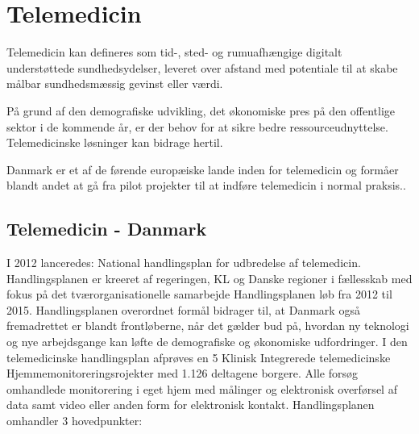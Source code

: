 \section{Telemedicin}
Telemedicin kan defineres som tid-, sted- og rumuafhængige digitalt understøttede sundhedsydelser, leveret over afstand med potentiale til at skabe målbar sundhedsmæssig gevinst eller værdi\cite{Regioner2012}.

På grund af den demografiske udvikling, det økonomiske pres på den offentlige sektor i de kommende år, er der behov for at sikre bedre ressourceudnyttelse. Telemedicinske løsninger kan bidrage hertil.\cite{Regioner2012}
 
Danmark er et af de førende europæiske lande inden for telemedicin og formåer blandt andet at gå fra pilot projekter til at indføre telemedicin i normal praksis.\cite{FabienneAbadieCristianoCodagnone2011}.
  

\subsection{Telemedicin - Danmark}

I 2012 lanceredes: \textquotedbl National handlingsplan for udbredelse af telemedicin\textquotedbl. Handlingsplanen er kreeret af regeringen, KL og Danske regioner i fællesskab med fokus på det tværorganisationelle samarbejde Handlingsplanen løb fra 2012 til 2015. 
Handlingsplanen overordnet formål bidrager til, at Danmark også fremadrettet er blandt frontløberne, når det gælder bud på, hvordan ny teknologi og nye arbejdsgange kan løfte de demografiske og økonomiske udfordringer.\cite{Regioner2012} 
I den telemedicinske handlingsplan afprøves en 5 Klinisk Integrerede telemedicinske Hjemmemonitoreringsrojekter med 1.126 deltagene borgere. Alle forsøg omhandlede monitorering i eget hjem med målinger og elektronisk overførsel af data samt video eller anden form for elektronisk kontakt. Handlingsplanen omhandler 3 hovedpunkter: \cite{Regeringen2012} 

